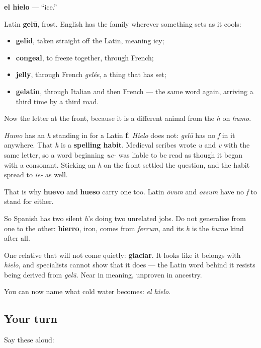 \begin{cousinweb}
\textbf{el hielo} — \textquotedblleft{}ice.\textquotedblright{}

Latin \textbf{gelū}, frost. English has the family wherever something sets as it cools:

\begin{itemize}
\raggedright
  \item \textbf{gelid}, taken straight off the Latin, meaning icy;
  \item \textbf{congeal}, to freeze together, through French;
  \item \textbf{jelly}, through French \emph{gelée}, a thing that has set;
  \item \textbf{gelatin}, through Italian and then French — the same word again, arriving a third time by a third road.
\end{itemize}

Now the letter at the front, because it is a different animal from the \emph{h} on \emph{humo}.

\emph{Humo} has an \emph{h} standing in for a Latin \textbf{f}. \emph{Hielo} does not: \emph{gelū} has no \emph{f} in it anywhere. That \emph{h} is a \textbf{spelling habit}. Medieval scribes wrote \emph{u} and \emph{v} with the same letter, so a word beginning \emph{ue-} was liable to be read as though it began with a consonant. Sticking an \emph{h} on the front settled the question, and the habit spread to \emph{ie-} as well.

That is why \textbf{huevo} and \textbf{hueso} carry one too. Latin \emph{ōvum} and \emph{ossum} have no \emph{f} to stand for either.

So Spanish has two silent \emph{h}'s doing two unrelated jobs. Do not generalise from one to the other: \textbf{hierro}, iron, comes from \emph{ferrum}, and its \emph{h} is the \emph{humo} kind after all.

One relative that will not come quietly: \textbf{glaciar}. It looks like it belongs with \emph{hielo}, and specialists cannot show that it does — the Latin word behind it resists being derived from \emph{gelū}. Near in meaning, unproven in ancestry.
\end{cousinweb}

\begin{grammarlens}[title={What you've built}]
You can now name what cold water becomes: \emph{el hielo}.
\end{grammarlens}

\subsection*{Your turn}
Say these aloud:

